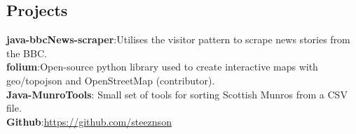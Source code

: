 \documentclass[12pt, a4paper]{article}
\begin{document}
\begin{multicols}{2}
\section{Projects}
\noindent\textbf{java-bbcNews-scraper}:Utilises the visitor pattern to scrape news stories from the BBC.\\
\textbf{folium}:Open-source python library used to create interactive maps with geo/topojson and OpenStreetMap (contributor).\\
\textbf{Java-MunroTools}: Small set of tools for sorting Scottish Munros from a CSV file.\\
\textbf{Github}:\url{https://github.com/steeznson}

\end{multicols}
\end{document}

